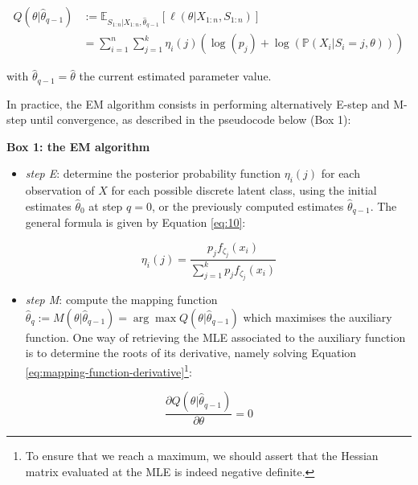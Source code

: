 \begin{equation}
\begin{split}
Q(\theta|\hat{\theta}_{q-1}) & := \mathbb{E}_{S_{1:n}| X_{1:n}, \hat{\theta}_{q-1}} \left[\ell(\theta | X_{1:n}, S_{1:n})\right] \\
&=\sum_{i=1}^n \sum_{j=1}^k \eta_{i}(j) \left( \log (p_j) +  \log (\mathbb{P}(X_i|S_i=j, \theta)) \right)
\end{split}
\label{eq:8}
\end{equation}

with \(\hat{\theta}_{q-1}=\hat{\theta}\) the current estimated parameter
value.

In practice, the EM algorithm consists in performing alternatively E-step and M-step until convergence, as described in the pseudocode below (Box 1):

\begin{blackbox}{\textbf{Box 1: the EM algorithm}}

\begin{center}

\begin{itemize}
\tightlist
\item
  \emph{step E}: determine the posterior probability function \(\eta_i(j)\)
  for each observation of \(X\) for each possible discrete latent class,
  using the initial estimates \(\hat{\theta}_0\) at step \(q=0\), or the
  previously computed estimates \(\hat{\theta}_{q-1}\). The general formula is given by Equation \eqref{eq:10}:
\end{itemize}

\begin{equation}
    \eta_i(j) = \frac{p_j f_{\zeta_j} (x_i)}{\sum_{j=1}^k p_j f_{\zeta_j} (x_i)}
\label{eq:10}
\end{equation}

\begin{itemize}
\tightlist
\item
  \emph{step M}: compute the mapping function
  \(\hat{\theta}_q:=M(\theta | \hat{\theta}_{q-1})=\arg \max Q(\theta| \hat{\theta}_{q-1})\) which maximises the auxiliary function. One way of retrieving the MLE associated to the auxiliary function is to determine the roots of its derivative, namely solving Equation \eqref{eq:mapping-function-derivative}\footnote{To ensure
    that we reach a maximum, we should assert that the Hessian matrix evaluated at the MLE is indeed negative definite.}:
\end{itemize}

\begin{equation}
    \frac{\partial Q(\theta| \hat{\theta}_{q-1})}{\partial \theta}=0
\label{eq:mapping-function-derivative}
\end{equation}

\end{center}

\end{blackbox}

